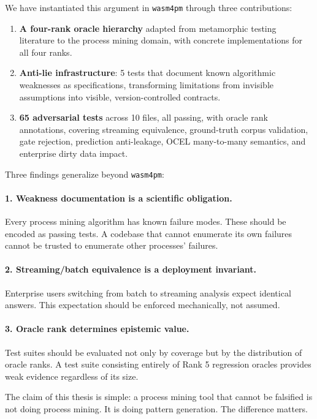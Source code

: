 \documentclass[12pt,a4paper]{article}
\begin{document}
We have instantiated this argument in \texttt{wasm4pm} through three contributions:

\begin{enumerate}
  \item \textbf{A four-rank oracle hierarchy} adapted from metamorphic testing
    literature to the process mining domain, with concrete implementations for all
    four ranks.
  \item \textbf{Anti-lie infrastructure}: 5 tests that document known algorithmic
    weaknesses as specifications, transforming limitations from invisible
    assumptions into visible, version-controlled contracts.
  \item \textbf{65 adversarial tests} across 10 files, all passing, with oracle
    rank annotations, covering streaming equivalence, ground-truth corpus
    validation, gate rejection, prediction anti-leakage, OCEL many-to-many
    semantics, and enterprise dirty data impact.
\end{enumerate}

Three findings generalize beyond \texttt{wasm4pm}:

\paragraph{1. Weakness documentation is a scientific obligation.} Every process
mining algorithm has known failure modes. These should be encoded as passing
tests. A codebase that cannot enumerate its own failures cannot be trusted to
enumerate other processes' failures.

\paragraph{2. Streaming/batch equivalence is a deployment invariant.} Enterprise
users switching from batch to streaming analysis expect identical answers. This
expectation should be enforced mechanically, not assumed.

\paragraph{3. Oracle rank determines epistemic value.} Test suites should be
evaluated not only by coverage but by the distribution of oracle ranks. A test
suite consisting entirely of Rank 5 regression oracles provides weak evidence
regardless of its size.

\medskip
The claim of this thesis is simple: a process mining tool that cannot be
falsified is not doing process mining. It is doing pattern generation. The
difference matters.
\end{document}
